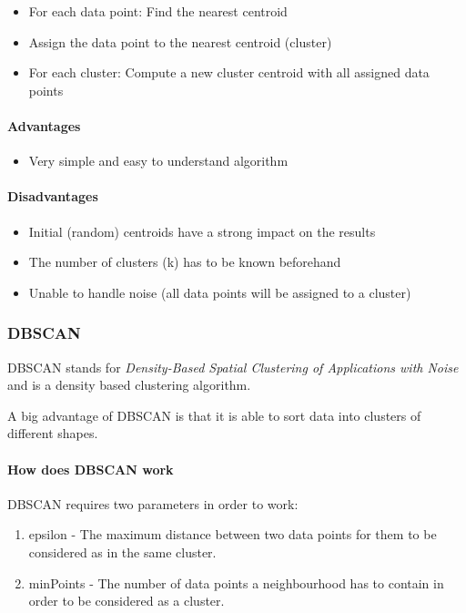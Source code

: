 \begin{itemize}
    \item For each data point: Find the nearest centroid
    \item Assign the data point to the nearest centroid (cluster)
    \item For each cluster: Compute a new cluster centroid with all assigned data points
\end{itemize}

\paragraph{Advantages}
\begin{itemize}
    \item Very simple and easy to understand algorithm
\end{itemize}

\paragraph{Disadvantages}
\begin{itemize}
    \item Initial (random) centroids have a strong impact on the results
    \item The number of clusters (k) has to be known beforehand
    \item Unable to handle noise (all data points will be assigned to a cluster)
\end{itemize}

\subsubsection{DBSCAN}
DBSCAN stands for \textit{Density-Based Spatial Clustering of Applications with Noise}
and is a density based clustering algorithm.

A big advantage of DBSCAN is that it is able to sort data into clusters
of different shapes.

\paragraph{How does DBSCAN work}
DBSCAN requires two parameters in order to work:

\begin{enumerate}
    \item epsilon - The maximum distance between two data points for them to be considered as in the same cluster.
    \item minPoints - The number of data points a neighbourhood has to contain in order to be considered as a cluster.
\end{enumerate}

